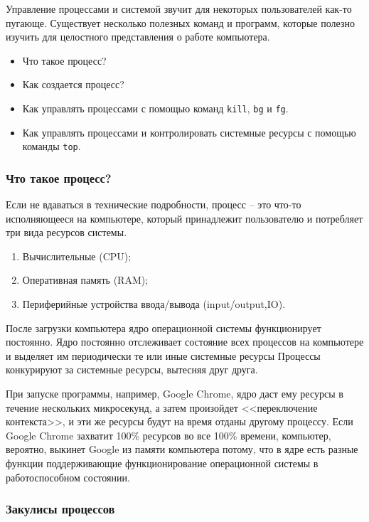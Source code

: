 \documentclass[12pt]{article}
\providecommand{\tightlist}{%
  \setlength{\itemsep}{0pt}\setlength{\parskip}{0pt}}
\begin{document}
Управление процессами и системой звучит для некоторых пользователей как-то пугающе.
Существует несколько полезных команд и программ,
которые полезно изучить для целостного представления о работе компьютера.
\begin{itemize}
\tightlist
\item
  Что такое процесс?
\item
  Как создается процесс?
\item
  Как управлять процессами с помощью команд \texttt{kill}, \texttt{bg} и \texttt{fg}.
\item
  Как управлять процессами и контролировать системные ресурсы с помощью
  команды \texttt{top}.
\end{itemize}

\hypertarget{What-is-a-Process}{%
\subsubsection{\texorpdfstring{\protect\hyperlink{What-is-a-Process}{}Что
такое процесс?}{Что такое процесс?}}\label{What-is-a-Process}}

Если не вдаваться в технические подробности, процесс -- это что-то
исполняющееся на компьютере, который принадлежит пользователю и
потребляет три вида ресурсов системы.
\begin{enumerate}
\tightlist
\item
  Вычислительные (CPU);
\item
  Оперативная память (RAM);
\item
  Периферийные устройства ввода/вывода (input/output,IO).
\end{enumerate}

После загрузки компьютера ядро операционной системы функционирует
постоянно. Ядро постоянно отслеживает состояние всех процессов на
компьютере и выделяет им периодически те или иные системные ресурсы
Процессы конкурируют за системные ресурсы, вытесняя друг друга.

При запуске программы, например, Google Chrome, ядро даст ему
ресурсы в течение нескольких микросекунд, а затем произойдет
<<переключение контекста>>, и эти же ресурсы будут на время отданы
другому процессу. Если Google Chrome захватит 100\% ресурсов во все
100\% времени, компьютер, вероятно, выкинет Google из памяти компьютера
потому, что в ядре есть разные функции поддерживающие функционирование
операционной системы в работоспособном состоянии.

\hypertarget{Processes-Behind-the-Scenes}{%
\subsubsection{\texorpdfstring{\protect\hyperlink{Processes-Behind-the-Scenes}{}Закулисы
процессов}{Закулисы процессов}}\label{Processes-Behind-the-Scenes}}
\end{document}
